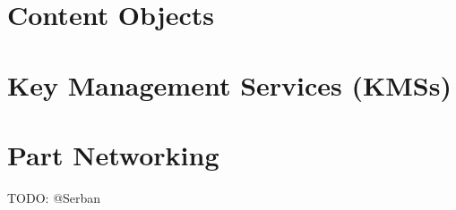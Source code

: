 
\maketitle



\setcounter{section}{-1}






\section{Content Objects}

\section{Key Management Services (KMSs)}

\section{Part Networking}
TODO: @Serban



